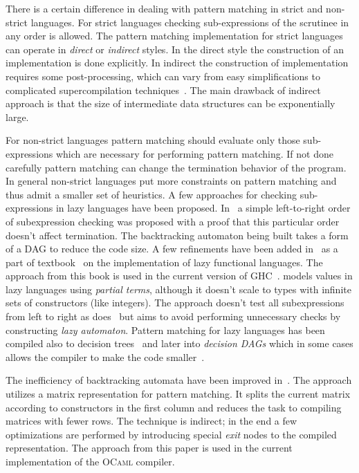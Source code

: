 There is a certain difference in dealing with pattern matching in strict and non-strict languages. For strict languages checking sub-expressions of the scrutinee in any order is allowed.
The pattern matching implementation for strict languages can operate in \emph{direct} or \emph{indirect} styles. In the direct style the construction of an implementation is done explicitly. In indirect the construction of implementation requires some post-processing, which can vary from easy simplifications to complicated supercompilation
techniques~\cite{sestoft1996}. The main drawback of indirect approach is that the size of intermediate data structures can be exponentially large.

For non-strict languages pattern matching should evaluate only those sub-expressions which are necessary for performing pattern matching. If not done carefully pattern matching can
change the termination behavior of the program. In general non-strict languages put more constraints on pattern matching and thus admit a smaller  set of heuristics. 
A few approaches for checking sub-expressions in lazy languages have been proposed. In~\cite{augustsson1985} a simple left-to-right order of subexpression checking was proposed
with a proof that this particular order doesn't affect termination. The backtracking automaton being built takes a form of a DAG to reduce the code size. A few refinements have been added in~\cite{wadler1987}
as a part of textbook~\cite{peytonjones1987} on the implementation of lazy functional languages. The approach from this book is used in the current version of GHC~\cite{marlow2012the}.
\cite{laville1991} models values in lazy languages using \emph{partial terms}, although it doesn't scale to types with infinite sets of constructors (like integers). The approach doesn't
test all subexpressions from left to right as does~\cite{augustsson1985} but aims to  avoid performing unnecessary checks by constructing \emph{lazy automaton}. Pattern matching for
lazy languages has been compiled also to decision trees~\cite{maranget1992} and later into \emph{decision DAGs} which in some cases allows the compiler to make the code
smaller~\cite{maranget1994}.

The inefficiency of backtracking automata have been
improved in~\cite{maranget2001}. The approach utilizes a matrix representation for pattern matching. It splits the current matrix according to constructors in the
first column and reduces the task to compiling matrices with fewer rows. The technique is indirect; in the end a few optimizations are performed by introducing
special \emph{exit} nodes to the compiled representation. %
The approach from this paper is used in the current implementation of the \textsc{OCaml} compiler.

